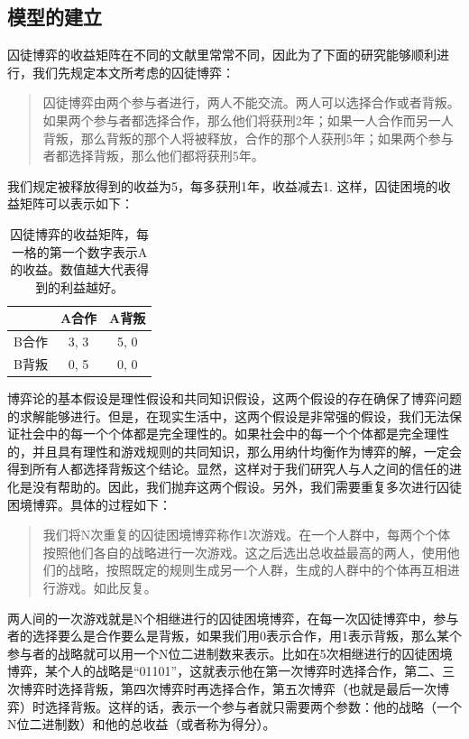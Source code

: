 \documentclass[lang=cn,11pt]{elegantpaper}
\begin{document}
\subsection{模型的建立}
囚徒博弈的收益矩阵在不同的文献里常常不同，因此为了下面的研究能够顺利进行，我们先规定本文所考虑的囚徒博弈：
\begin{quotation}
	囚徒博弈由两个参与者进行，两人不能交流。两人可以选择合作或者背叛。如果两个参与者都选择合作，那么他们将获刑2年；如果一人合作而另一人背叛，那么背叛的那个人将被释放，合作的那个人获刑5年；如果两个参与者都选择背叛，那么他们都将获刑5年。
\end{quotation}
我们规定被释放得到的收益为5，每多获刑1年，收益减去1. 这样，囚徒困境的收益矩阵可以表示如下：
\begin{table}[htb]
	\centering
	\begin{tabular}{c|cc}
		& A合作 & A背叛 \\
		\hline
		B合作 & 3, 3 & 5, 0 \\
		B背叛 & 0, 5 & 0, 0 \\
	\end{tabular}
	\caption{囚徒博弈的收益矩阵，每一格的第一个数字表示A的收益。数值越大代表得到的利益越好。}
\end{table}
博弈论的基本假设是理性假设和共同知识假设，这两个假设的存在确保了博弈问题的求解能够进行。但是，在现实生活中，这两个假设是非常强的假设，我们无法保证社会中的每一个个体都是完全理性的。如果社会中的每一个个体都是完全理性的，并且具有理性和游戏规则的共同知识，那么用纳什均衡作为博弈的解，一定会得到所有人都选择背叛这个结论。显然，这样对于我们研究人与人之间的信任的进化是没有帮助的。因此，我们抛弃这两个假设。另外，我们需要重复多次进行囚徒困境博弈。具体的过程如下：
\begin{quotation}
	我们将N次重复的囚徒困境博弈称作1次游戏。在一个人群中，每两个个体按照他们各自的战略进行一次游戏。这之后选出总收益最高的两人，使用他们的战略，按照既定的规则生成另一个人群，生成的人群中的个体再互相进行游戏。如此反复。
\end{quotation}

两人间的一次游戏就是N个相继进行的囚徒困境博弈，在每一次囚徒博弈中，参与者的选择要么是合作要么是背叛，如果我们用0表示合作，用1表示背叛，那么某个参与者的战略就可以用一个N位二进制数来表示。比如在5次相继进行的囚徒困境博弈，某个人的战略是“01101”，这就表示他在第一次博弈时选择合作，第二、三次博弈时选择背叛，第四次博弈时再选择合作，第五次博弈（也就是最后一次博弈）时选择背叛。这样的话，表示一个参与者就只需要两个参数：他的战略（一个N位二进制数）和他的总收益（或者称为得分）。
\end{document}
